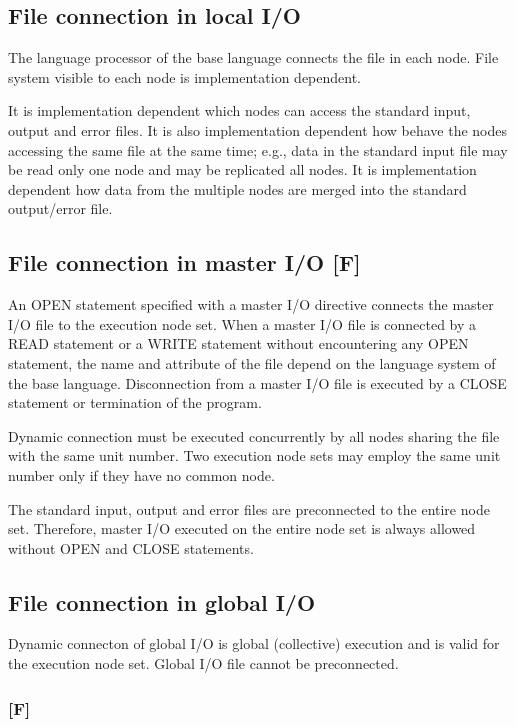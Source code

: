   \subsection{File connection in local I/O}

  The language processor of the base language connects the file in each
  node.
  File system visible to each node is implementation dependent.

  It is implementation dependent which nodes can access the standard
  input, output and error files.
  It is also implementation dependent how behave the nodes accessing the
  same file at the same time; e.g., data in the standard input file may
  be read only one node and may be replicated all nodes.
  It is implementation dependent how data from the multiple nodes are
  merged into the standard output/error file.
  
  \subsection{File connection in master I/O [F]}

  An OPEN statement specified with a master I/O directive connects the
  master I/O file to the execution node set.
  When a master I/O file is connected by a READ statement or a WRITE
  statement without encountering any OPEN statement, the name and
  attribute of the file depend on the language system of the base
  language.
  Disconnection from a master I/O file is executed by a CLOSE statement
  or termination of the program.

  Dynamic connection must be executed concurrently by all nodes sharing
  the file with the same unit number.
  Two execution node sets may employ the same unit number only if they
  have no common node.

  The standard input, output and error files are preconnected to the
  entire node set.
  Therefore, master I/O executed on the entire node set is always
  allowed without OPEN and CLOSE statements.


  \subsection{File connection in global I/O}

  Dynamic connecton of global I/O is global (collective) execution and
  is valid for the execution node set.
  Global I/O file cannot be preconnected.

  \subsubsection*{[F]}

